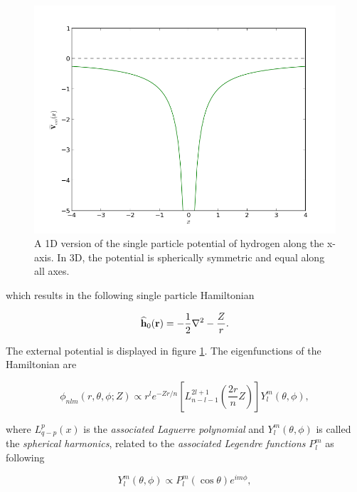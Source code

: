 \begin{figure}
 \begin{center}
  \includegraphics[scale=0.5]{../Graphics/Potentials/hydrogen.png}
  \caption{A 1D version of the single particle potential of hydrogen along the x-axis. In 3D, the potential is spherically symmetric and equal along all axes.}
  \label{fig:extPotHydrogen}
 \end{center}
\end{figure}

which results in the following single particle Hamiltonian

\begin{equation}
 {\bf\widehat{h}}_0(\mathbf{r}) = -\frac{1}{2}\nabla^2 - \frac{Z}{r}.
\end{equation}

The external potential is displayed in figure \ref{fig:extPotHydrogen}. The eigenfunctions of the Hamiltonian are

\begin{equation}
 \phi_{nlm}(r, \theta, \phi; Z) \propto r^l e^{-Zr/n}\left[L_{n-l-1}^{2l+1}\left(\frac{2r}{n}Z\right)\right] Y_l^m(\theta, \phi), \label{eq:hydrogenBasisComplex}
\end{equation}

where $L_{q-p}^p(x)$ is the \textit{associated Laguerre polynomial} and $Y_l^m(\theta, \phi)$ is called the \textit{spherical harmonics}, related to the \textit{associated Legendre functions} $P_l^m$ as following

\begin{equation}
 Y_l^m(\theta, \phi) \propto   P_l^m(\cos\theta)e^{im\phi}, \label{eq:spherHarm}
\end{equation}

